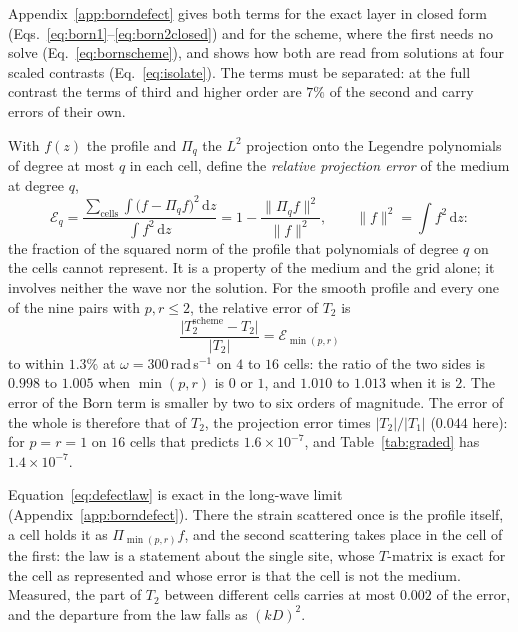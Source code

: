 \documentclass[preprint,review,12pt]{elsarticle}
\newcommand{\dd}{\mathrm{d}}
\begin{document}
Appendix~\ref{app:borndefect} gives both terms for the exact layer in closed form
(Eqs.~\eqref{eq:born1}--\eqref{eq:born2closed}) and for the scheme, where the first needs no solve
(Eq.~\eqref{eq:bornscheme}), and shows how both are read from solutions at four scaled contrasts
(Eq.~\eqref{eq:isolate}). The terms must be separated: at the full contrast the terms of third and
higher order are $7\%$ of the second and carry errors of their own.

With $f(z)$ the profile and $\Pi_q$
the $L^2$ projection onto the Legendre polynomials of degree at most $q$ in each cell, define the
\emph{relative projection error} of the medium at degree $q$,
\begin{equation}\label{eq:defect}
  \mathcal{E}_q=\frac{\sum_{\text{cells}}\int\bigl(f-\Pi_qf\bigr)^2\,\dd z}{\int f^2\,\dd z}
     =1-\frac{\lVert\Pi_qf\rVert^2}{\lVert f\rVert^2},\qquad \lVert f\rVert^2=\int f^2\,\dd z:
\end{equation}
the fraction of the squared norm of the profile that polynomials of degree $q$ on the cells cannot
represent. It is a property of the medium and the grid alone; it involves neither the wave nor the
solution.
For the smooth profile and every one of the nine pairs with $p,r\le2$, the relative error of $T_2$ is
\begin{equation}\label{eq:defectlaw}
  \frac{\lvert T_2^{\text{scheme}}-T_2\rvert}{\lvert T_2\rvert}=\mathcal{E}_{\min(p,r)}
\end{equation}
to within $1.3\%$ at $\omega=300$\,rad\,s$^{-1}$ on $4$ to $16$ cells: the ratio of the two sides is
$0.998$ to $1.005$ when $\min(p,r)$ is $0$ or $1$, and $1.010$ to $1.013$ when it is $2$. The error of the
Born term is smaller by two to six orders of magnitude. The error of the whole is therefore that of
$T_2$, the projection error times $\lvert T_2\rvert/\lvert T_1\rvert$ ($0.044$ here): for $p=r=1$ on $16$ cells
that predicts $1.6\times10^{-7}$, and Table~\ref{tab:graded} has $1.4\times10^{-7}$.

Equation~\eqref{eq:defectlaw} is exact in the long-wave limit (Appendix~\ref{app:borndefect}). There
the strain scattered once is the profile itself, a cell holds it as $\Pi_{\min(p,r)}f$, and the
second scattering takes place in the cell of the first: the law is a statement about the single site,
whose $T$-matrix is exact for the cell as represented and whose error is that the cell is not the
medium. Measured, the part of $T_2$ between different cells carries at most $0.002$ of the error, and
the departure from the law falls as $(kD)^2$.
\end{document}
